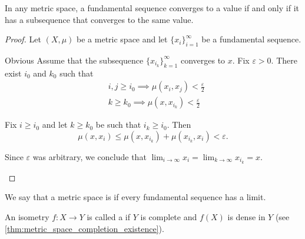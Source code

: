 \begin{proposition}\label{thm:fundamental_subsequence_convergence}
  In any metric space, a fundamental sequence converges to a value if and only if it has a subsequence that converges to the same value.
\end{proposition}
\begin{proof}
  Let \( (X, \mu) \) be a metric space and let \( \{ x_i \}_{i=1}^\infty \) be a fundamental sequence.

  \begin{description}
    \Implies Obvious
    \ImpliedBy Assume that the subsequence \( \{ x_{i_k} \}_{k=1}^\infty \) converges to \( x \). Fix \( \varepsilon > 0 \). There exist \( i_0 \) and \( k_0 \) such that
    \begin{align*}
      &i, j \geq i_0 \implies \mu(x_i, x_j) < \tfrac \varepsilon 2 \\
      &k \geq k_0 \implies \mu(x, x_{i_k}) < \tfrac \varepsilon 2
    \end{align*}

    Fix \( i \geq i_0 \) and let \( k \geq k_0 \) be such that \( i_k \geq i_0 \). Then
    \begin{equation*}
      \mu(x, x_i) \leq \mu(x, x_{i_k}) + \mu(x_{i_k}, x_i) < \varepsilon.
    \end{equation*}

    Since \( \varepsilon \) was arbitrary, we conclude that \( \lim_{i \to \infty} x_i = \lim_{k \to \infty} x_{i_k} = x \).
  \end{description}
\end{proof}

\begin{definition}\label{def:complete_metric_space}
  We say that a metric space is  if every fundamental sequence has a limit.

  An isometry \( f: X \to Y \) is called a  if \( Y \) is complete and \( f(X) \) is dense in \( Y \) (see \cref{thm:metric_space_completion_existence}).
\end{definition}

